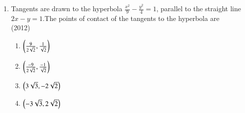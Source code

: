 \documentclass[journal,12pt,twocolumn]{IEEEtran}
\theoremstyle{remark}
\begin{document}
\begin{enumerate}
	\item Tangents are drawn to the hyperbola $\frac{x^2}{9}-\frac{y^2}{4}=1$, parallel to the straight line $2x-y=1$.The points of contact of the tangents to the hyperbola
		are \\
		\hfill(2012)
		\\
		\begin{enumerate}
			\item $\left(\frac{9}{2\sqrt{2}},\frac{1}{\sqrt{2}}\right)$ 
			\item $ \left(\frac{-9}{2\sqrt{2}},\frac{-1}{\sqrt{2}}\right)$
			\item $\left(3\sqrt{3},-2\sqrt{2}\right)$
			\item $ \left(-3\sqrt{3},2\sqrt{2}\right)$
		
		\end{enumerate}


\end{enumerate}
\end{document}
